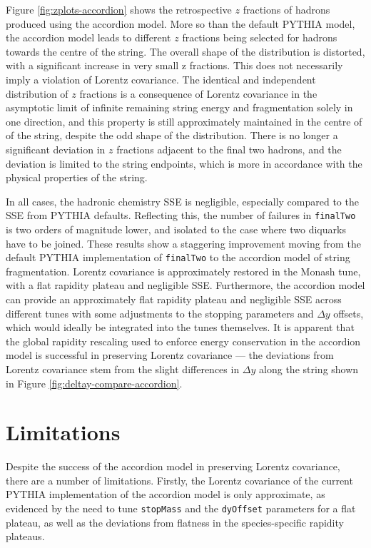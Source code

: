 \documentclass[12pt,a4paper]{report}
\begin{document}
Figure \ref{fig:zplots-accordion} shows the retrospective $z$ fractions of hadrons produced using the accordion model. More so than the default PYTHIA model, the accordion model leads to different $z$ fractions being selected for hadrons towards the centre of the string. The overall shape of the distribution is distorted, with a significant increase in very small z fractions. This does not necessarily imply a violation of Lorentz covariance. The identical and independent distribution of $z$ fractions is a consequence of Lorentz covariance in the asymptotic limit of infinite remaining string energy and fragmentation solely in one direction, and this property is still approximately maintained in the centre of of the string, despite the odd shape of the distribution. There is no longer a significant deviation in $z$ fractions adjacent to the final two hadrons, and the deviation is limited to the string endpoints, which is more in accordance with the physical properties of the string.

In all cases, the hadronic chemistry SSE is negligible, especially compared to the SSE from PYTHIA defaults. Reflecting this, the number of failures in \texttt{finalTwo} is two orders of magnitude lower, and isolated to the case where two diquarks have to be joined. These results show a staggering improvement moving from the default PYTHIA implementation of \texttt{finalTwo} to the accordion model of string fragmentation. Lorentz covariance is approximately restored in the Monash tune, with a flat rapidity plateau and negligible SSE. Furthermore, the accordion model can provide an approximately flat rapidity plateau and negligible SSE across different tunes with some adjustments to the stopping parameters and $\Delta y$ offsets, which would ideally be integrated into the tunes themselves. It is apparent that the global rapidity rescaling used to enforce energy conservation in the accordion model is successful in preserving Lorentz covariance --- the deviations from Lorentz covariance stem from the slight differences in $\Delta y$ along the string shown in Figure \ref{fig:deltay-compare-accordion}.

\section{Limitations}
\label{chap:accordion-limitations}

Despite the success of the accordion model in preserving Lorentz covariance, there are a number of limitations. Firstly, the Lorentz covariance of the current PYTHIA implementation of the accordion model is only approximate, as evidenced by the need to tune \texttt{stopMass} and the \texttt{dyOffset} parameters for a flat plateau, as well as the deviations from flatness in the species-specific rapidity plateaus.
\end{document}
